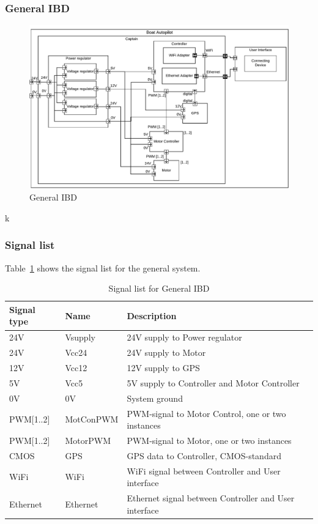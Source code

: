 \subsubsection{General IBD}
\begin{figure}[H]
	\centering
	\includegraphics[width=1\linewidth]{Images/System_architecture/General_IBD}
	\caption{General IBD}
\end{figure}

k

\subsubsection{Signal list}

Table~\ref*{table: General IBD} shows the signal list for the general system.
\begin{table}[htbp]
	\centering
	\begin{tabular}{|l|l|l|}
		\hline
		\textbf{Signal type} 	&\textbf{Name}		&\textbf{Description} \\\hline
		24V			&Vsupply	&24V supply to Power regulator\\\hline
		
		24V			&Vcc24		&24V supply to Motor\\\hline
		12V			&Vcc12		&12V supply to GPS\\\hline
		5V			&Vcc5		&5V supply to Controller and Motor Controller\\\hline
		0V			&0V			&System ground\\\hline
		PWM[1..2]	&MotConPWM	&PWM-signal to Motor Control, one or two instances\\\hline
		PWM[1..2]	&MotorPWM	&PWM-signal to Motor, one or two instances\\\hline
		CMOS		&GPS		&GPS data to Controller, CMOS-standard\\\hline	
		WiFi		&WiFi		&WiFi signal between Controller and User interface\\\hline
		Ethernet	&Ethernet	&Ethernet signal between Controller and User interface\\\hline
		
		
	\end{tabular}
	\caption{Signal list for General IBD}
	\label{table: General IBD}
\end{table}

